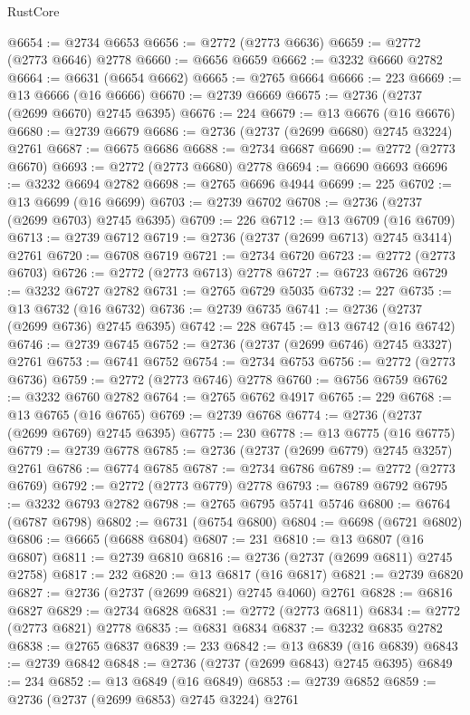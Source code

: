\begin{lexlean}{RustCore}
\begin{coremodule}
@6654 := @2734 @6653
@6656 := @2772 (@2773 @6636)
@6659 := @2772 (@2773 @6646) @2778
@6660 := @6656 @6659
@6662 := @3232 @6660 @2782
@6664 := @6631 (@6654 @6662)
@6665 := @2765 @6664
@6666 := 223
@6669 := @13 @6666 (@16 @6666)
@6670 := @2739 @6669
@6675 := @2736 (@2737 (@2699 @6670) @2745 @6395)
@6676 := 224
@6679 := @13 @6676 (@16 @6676)
@6680 := @2739 @6679
@6686 := @2736 (@2737 (@2699 @6680) @2745 @3224) @2761
@6687 := @6675 @6686
@6688 := @2734 @6687
@6690 := @2772 (@2773 @6670)
@6693 := @2772 (@2773 @6680) @2778
@6694 := @6690 @6693
@6696 := @3232 @6694 @2782
@6698 := @2765 @6696 @4944
@6699 := 225
@6702 := @13 @6699 (@16 @6699)
@6703 := @2739 @6702
@6708 := @2736 (@2737 (@2699 @6703) @2745 @6395)
@6709 := 226
@6712 := @13 @6709 (@16 @6709)
@6713 := @2739 @6712
@6719 := @2736 (@2737 (@2699 @6713) @2745 @3414) @2761
@6720 := @6708 @6719
@6721 := @2734 @6720
@6723 := @2772 (@2773 @6703)
@6726 := @2772 (@2773 @6713) @2778
@6727 := @6723 @6726
@6729 := @3232 @6727 @2782
@6731 := @2765 @6729 @5035
@6732 := 227
@6735 := @13 @6732 (@16 @6732)
@6736 := @2739 @6735
@6741 := @2736 (@2737 (@2699 @6736) @2745 @6395)
@6742 := 228
@6745 := @13 @6742 (@16 @6742)
@6746 := @2739 @6745
@6752 := @2736 (@2737 (@2699 @6746) @2745 @3327) @2761
@6753 := @6741 @6752
@6754 := @2734 @6753
@6756 := @2772 (@2773 @6736)
@6759 := @2772 (@2773 @6746) @2778
@6760 := @6756 @6759
@6762 := @3232 @6760 @2782
@6764 := @2765 @6762 @4917
@6765 := 229
@6768 := @13 @6765 (@16 @6765)
@6769 := @2739 @6768
@6774 := @2736 (@2737 (@2699 @6769) @2745 @6395)
@6775 := 230
@6778 := @13 @6775 (@16 @6775)
@6779 := @2739 @6778
@6785 := @2736 (@2737 (@2699 @6779) @2745 @3257) @2761
@6786 := @6774 @6785
@6787 := @2734 @6786
@6789 := @2772 (@2773 @6769)
@6792 := @2772 (@2773 @6779) @2778
@6793 := @6789 @6792
@6795 := @3232 @6793 @2782
@6798 := @2765 @6795 @5741 @5746
@6800 := @6764 (@6787 @6798)
@6802 := @6731 (@6754 @6800)
@6804 := @6698 (@6721 @6802)
@6806 := @6665 (@6688 @6804)
@6807 := 231
@6810 := @13 @6807 (@16 @6807)
@6811 := @2739 @6810
@6816 := @2736 (@2737 (@2699 @6811) @2745 @2758)
@6817 := 232
@6820 := @13 @6817 (@16 @6817)
@6821 := @2739 @6820
@6827 := @2736 (@2737 (@2699 @6821) @2745 @4060) @2761
@6828 := @6816 @6827
@6829 := @2734 @6828
@6831 := @2772 (@2773 @6811)
@6834 := @2772 (@2773 @6821) @2778
@6835 := @6831 @6834
@6837 := @3232 @6835 @2782
@6838 := @2765 @6837
@6839 := 233
@6842 := @13 @6839 (@16 @6839)
@6843 := @2739 @6842
@6848 := @2736 (@2737 (@2699 @6843) @2745 @6395)
@6849 := 234
@6852 := @13 @6849 (@16 @6849)
@6853 := @2739 @6852
@6859 := @2736 (@2737 (@2699 @6853) @2745 @3224) @2761

\end{coremodule}
\end{lexlean}
